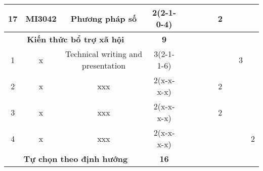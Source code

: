 \documentclass[12pt,a4paper]{report}
\begin{document}
\begin{landscape}
\begin{longtable}[c]{|c|c|c|c|c|c|c|c|c|c|c|c|}
        17                            & MI3042                          & Phương pháp số                                               & 2(2-1-0-4)                                                                           &             &             &             &             & 2           &             &             &             \\ \hline
        \multicolumn{3}{|c|}{\textbf{Kiến thức bổ trợ xã hội}}                                                                         & \textbf{9}                                                                           &             &             &             &             &             &             &             &             \\ \hline
        1                             & x                               & Technical writing and presentation                           & 3(2-1-1-6)                                                                           &             &             &             &             &             &             & 3           &             \\ \hline
        2                             & x                               & xxx                                                          & 2(x-x-x-x)                                                                           &             &             &             &             & 2           &             &             &             \\ \hline
        3                             & x                               & xxx                                                          & 2(x-x-x-x)                                                                           &             &             &             &             & 2           &             &             &             \\ \hline
        4                             & x                               & xxx                                                          & 2(x-x-x-x)                                                                           &             &             &             &             &             &             &             & 2           \\ \hline
        \multicolumn{3}{|c|}{\textbf{Tự chọn theo định hướng}}                                                                         & \textbf{16}                                                                          &             &             &             &             &             &             &             &             \\ \hline

\end{longtable}
\end{landscape}
\end{document}
